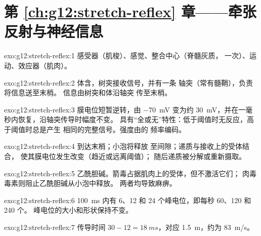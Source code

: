 \section*{第 \ref{ch:g12:stretch-reflex} 章——牵张反射与神经信息}

\begin{solution}{exo:g12:stretch-reflex:1}
感受器（肌梭）、感觉、整合中心（脊髓灰质，
一次）、运动、效应器（肌肉）。
\end{solution}

\begin{solution}{exo:g12:stretch-reflex:2}
体含，树突接收信号，并有一条
轴突（常有髓鞘），负责将信息送至末梢。
信息由树突和体沿轴突
传至末梢。
\end{solution}

\begin{solution}{exo:g12:stretch-reflex:3}
膜电位短暂逆转，由 \qty{-70}{mV} 变为约
\qty{+30}{mV}，并在一毫秒内恢复，沿轴突传导时幅度不变。
具有“全或无”特性：低于阈值时无反应，高于阈值时总是产生
相同的完整信号。强度由的
频率编码。
\end{solution}

\begin{solution}{exo:g12:stretch-reflex:4}
到达末梢；小泡将释放
至间隙；递质与接收上的受体结合，
使其膜电位发生改变（趋近或远离阈值）；
随后递质被分解或重新摄取。
\end{solution}

\begin{solution}{exo:g12:stretch-reflex:5}
乙酰胆碱。箭毒占据肌肉上的受体，但不激活它们；
肉毒毒素则阻止乙酰胆碱从小泡中释放。
两者均导致麻痹。
\end{solution}

\begin{solution}{exo:g12:stretch-reflex:6}
\qty{100}{ms} 内有 6、12 和 24 个峰电位，即每秒 60、120 和 240 个。
峰电位的大小和形状保持不变。
\end{solution}

\begin{solution}{exo:g12:stretch-reflex:7}
传导时间 $30 - 12 = \qty{18}{ms}$，对应 \qty{1.5}{m}，约为
\qty{83}{m/s}。
\end{solution}

